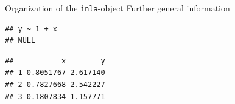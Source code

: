\documentclass[
  ignorenonframetext,
]{beamer}
\newenvironment{Shaded}{\begin{snugshade}}{\end{snugshade}}
\newcommand{\CommentTok}[1]{\textcolor[rgb]{0.56,0.35,0.01}{\textit{#1}}}
\newcommand{\DecValTok}[1]{\textcolor[rgb]{0.00,0.00,0.81}{#1}}
\newcommand{\NormalTok}[1]{#1}
\newcommand{\SpecialCharTok}[1]{\textcolor[rgb]{0.00,0.00,0.00}{#1}}
\begin{document}
\begin{frame}[fragile]{Organization of the \texttt{inla}-object}
\protect\hypertarget{organization-of-the-inla-object-3}{}
Further general information

\begin{Shaded}
\end{Shaded}

\begin{verbatim}
## y ~ 1 + x
## NULL
\end{verbatim}

\begin{Shaded}
\end{Shaded}

\begin{verbatim}
##           x        y
## 1 0.8051767 2.617140
## 2 0.7827668 2.542227
## 3 0.1807834 1.157771
\end{verbatim}

\begin{Shaded}
\end{Shaded}
\end{frame}
\end{document}
